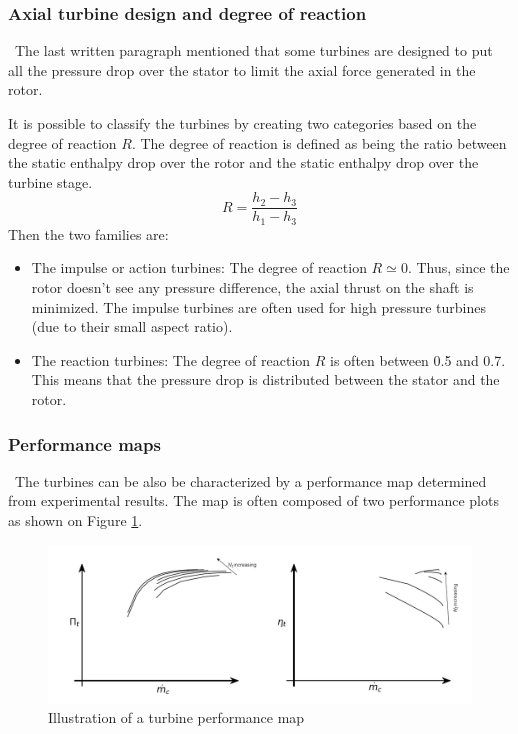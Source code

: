 \subsubsection{Axial turbine design and degree of reaction}
\quad\ The last written paragraph mentioned that some turbines are designed to put all the pressure drop over the stator to limit the axial force generated in the rotor.

It is possible to classify the turbines by creating two categories based on the degree of reaction \(R\). The degree of reaction is defined as being the ratio between the static enthalpy drop over the rotor and the static enthalpy drop over the turbine stage.
\begin{equation}
    R = \frac{h_2 - h_3}{h_1 - h_3}\label{eq:C3_R}
\end{equation}
Then the two families are:

\begin{itemize}
    \item The impulse or action turbines: The degree of reaction \(R\simeq 0\). Thus, since the rotor doesn't see any pressure difference, the axial thrust on the shaft is minimized. The impulse turbines are often used for high pressure turbines (due to their small aspect ratio).
    \item The reaction turbines: The degree of reaction \(R\) is often between 0.5 and 0.7. This means that the pressure drop is distributed between the stator and the rotor.
\end{itemize}

\subsubsection{Performance maps}
\quad\ The turbines can be also be characterized by a performance map determined from experimental results. The map is often composed of two performance plots as shown on Figure \ref{fig:C3_turbmap}.

\begin{figure}[h]
    \centering
    \includegraphics[width=\textwidth]{Turb_Map.png}
    \caption{Illustration of a turbine performance map}
    \label{fig:C3_turbmap}
\end{figure}

